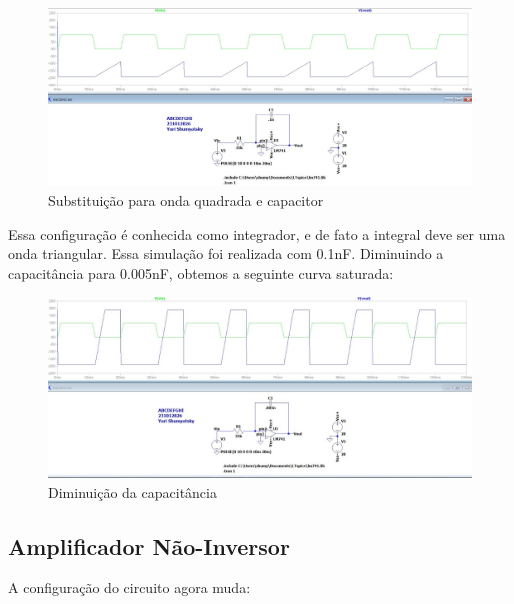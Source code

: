 \documentclass[10pt,twocolumn,letterpaper]{article}
\begin{document}
\begin{figure}[h]
\caption{Substituição para onda quadrada e capacitor}
\begin{center}
\includegraphics[scale=0.15]{figuras/fig6}
\end{center}
\end{figure}

Essa configuração é conhecida como integrador, e de fato a integral deve ser uma onda triangular. Essa simulação foi realizada com 0.1nF. Diminuindo a capacitância para 0.005nF, obtemos a seguinte curva saturada:

\begin{figure}[h]
\caption{Diminuição da capacitância}
\begin{center}
\includegraphics[scale=0.15]{figuras/fig7}
\end{center}
\end{figure}

\newpage
\subsection{Amplificador Não-Inversor}

A configuração do circuito agora muda:
\end{document}
